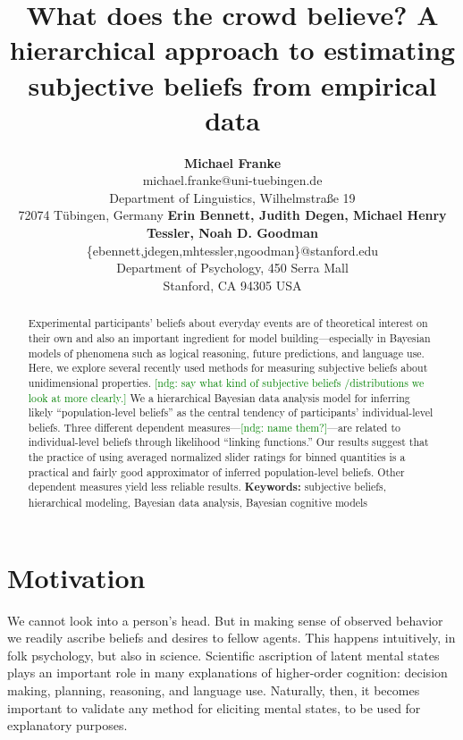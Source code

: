 \documentclass[10pt,letterpaper]{article}
\title{What does the crowd believe? A hierarchical approach to estimating subjective beliefs
  from empirical data}
\author{{\large \bf Michael Franke} \\
  michael.franke@uni-tuebingen.de \\
  Department of Linguistics, Wilhelmstra\ss e 19 \\
 72074 T\"{u}bingen, Germany \AND 
 {\large \bf Erin Bennett, Judith Degen, Michael Henry Tessler, Noah D. Goodman}\\
     \{ebennett,jdegen,mhtessler,ngoodman\}@stanford.edu \\
     Department of Psychology, 450 Serra Mall \\
  Stanford, CA 94305 USA }
\newcommand{\ndg}[1]{\textcolor{Green}{[ndg: #1]}}
\begin{document}
\maketitle




\begin{abstract}
  Experimental participants' beliefs about everyday events are of theoretical interest on their own and also an
  important ingredient for model building---especially in Bayesian models of phenomena such as logical
  reasoning, future predictions, and language use. Here, we explore several recently used 
  methods for measuring subjective beliefs about unidimensional properties. \ndg{say what kind of subjective beliefs /distributions we look at more clearly.} 
  We a hierarchical Bayesian data analysis model for inferring likely ``population-level beliefs'' as the central
  tendency of participants' individual-level beliefs. 
  Three different dependent measures---\ndg{name them?}---are related to individual-level beliefs through likelihood ``linking functions.''
  Our results suggest that the practice of
  using averaged normalized slider ratings for binned quantities is a practical and fairly good
  approximator of inferred population-level beliefs.
  Other dependent measures yield less reliable results.
\textbf{Keywords:} subjective beliefs, hierarchical modeling, Bayesian data analysis, Bayesian
cognitive models 
\end{abstract}




\section{Motivation}

We cannot look into a person's head. But in making sense of observed behavior we readily
ascribe beliefs and desires to fellow agents. This happens intuitively, in folk psychology, but
also in science. Scientific ascription of latent mental states plays an important role in many
explanations of higher-order cognition: decision making, planning, reasoning,
and language use. Naturally, then, it becomes important to validate any method for eliciting mental states, 
to be used for explanatory purposes.
\end{document}
